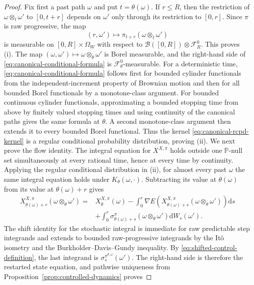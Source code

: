 \documentclass[11pt]{article}
\def\P{\mathbb{P}}
\def\Fc{{\mathcal F}}
\newcommand{\dd}{\mathrm{d}}
\theoremstyle{definition}
\theoremstyle{remark}
\numberwithin{equation}{section}
\begin{document}
\begin{proof}
Fix first a past path $\omega$ and put $t=\theta(\omega)$.  If $r\le R$, then the restriction of
$\omega\otimes_t\omega'$ to $[0,t+r]$ depends on $\omega'$ only through its restriction to
$[0,r]$.  Since $\pi$ is raw progressive, the map
\[
 (r,\omega')\longmapsto
 \pi_{t+r}(\omega\otimes_t\omega')
\]
is measurable on $[0,R]\times\Omega_W$ with respect to
$\mathcal B([0,R])\otimes\Fc_R^0$.  This proves (i).
The map $(\omega,\omega')\mapsto\omega\otimes_\theta\omega'$ is Borel measurable, and the
right-hand side of \eqref{eq:canonical-conditional-formula} is $\Fc_\theta^0$-measurable.  For a
deterministic time, \eqref{eq:canonical-conditional-formula} follows first for bounded cylinder
functionals from the independent-increment property of Brownian motion and then for all bounded
Borel functionals by a monotone-class argument.  For bounded continuous cylinder functionals, approximating a bounded stopping time from above
by finitely valued stopping times and using continuity of the canonical paths gives the same formula
at $\theta$.  A second monotone-class argument then extends it to every bounded Borel functional.
Thus the kernel \eqref{eq:canonical-rcpd-kernel} is a regular conditional probability
distribution, proving (ii).
We next prove the flow identity.  The integral equation for $X^{X,\pi}$ holds outside one
$\P$-null set simultaneously at every rational time, hence at every time by continuity.  Applying
the regular conditional distribution in (ii), for almost every past $\omega$ the same integral
equation holds under $K_\theta(\omega,\cdot)$.  Subtracting its value at $\theta(\omega)$ from its
value at $\theta(\omega)+r$ gives
\begin{align*}
 X_{\theta(\omega)+r}^{X,\pi}(\omega\otimes_\theta\omega')
 ={}&X_\theta^{X,\pi}(\omega)
 -\int_0^r\nabla E\!
 \left(X_{\theta(\omega)+s}^{X,\pi}(\omega\otimes_\theta\omega')\right)\dd s\\
 &+\int_0^r
 \sigma_{\theta(\omega)+s}^\pi(\omega\otimes_\theta\omega')\dd W_s(\omega').
\end{align*}
The shift identity for the stochastic integral is immediate for raw predictable step integrands and
extends to bounded raw-progressive integrands by the It\^o isometry and the
Burkholder--Davis--Gundy inequality.  By \eqref{eq:shifted-control-definition}, the last integrand is
$\sigma_s^{\pi^{\theta,\omega}}(\omega')$.  The right-hand side is therefore the restarted state
equation, and pathwise uniqueness from Proposition~\ref{prop:controlled-dynamics} proves

\end{proof}
\end{document}
